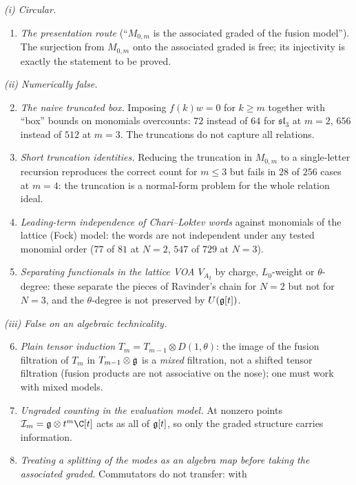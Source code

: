 \begin{warning}[title={Approaches to the total bound (Input T) that fail}]
\emph{(i) Circular.}
\begin{enumerate}
\item \emph{The presentation route} (``$M_{0,m}$ is the associated graded of the fusion model''). The surjection from $M_{0,m}$ onto the
  associated graded is free; its injectivity is exactly the statement to be proved.
\end{enumerate}
\emph{(ii) Numerically false.}
\begin{enumerate}\setcounter{enumi}{1}
\item \emph{The naive truncated box.} Imposing $f(k)w=0$ for $k\ge m$ together with ``box'' bounds on monomials overcounts: $72$ instead of
  $64$ for $\mathfrak{sl}_3$ at $m=2$, $656$ instead of $512$ at $m=3$. The truncations do not capture all relations.
\item \emph{Short truncation identities.} Reducing the truncation in $M_{0,m}$ to a single-letter recursion reproduces the correct count
  for $m\le3$ but fails in $28$ of $256$ cases at $m=4$: the truncation is a normal-form problem for the whole relation ideal.
\item \emph{Leading-term independence of Chari--Loktev words} against monomials of the lattice (Fock) model: the words are not independent
  under any tested monomial order ($77$ of $81$ at $N=2$, $547$ of $729$ at $N=3$).
\item \emph{Separating functionals in the lattice VOA $V_{A_2}$} by charge, $L_0$-weight or $\theta$-degree: these separate the pieces of
  Ravinder's chain for $N=2$ but not for $N=3$, and the $\theta$-degree is not preserved by $U(\mathfrak g[t])$.
\end{enumerate}
\emph{(iii) False on an algebraic technicality.}
\begin{enumerate}\setcounter{enumi}{5}
\item \emph{Plain tensor induction} $T_m=T_{m-1}\otimes D(1,\theta)$: the image of the fusion filtration of $T_m$ in $T_{m-1}\otimes\mathfrak g$ is
  a \emph{mixed} filtration, not a shifted tensor filtration (fusion products are not associative on the nose); one must work with mixed
  models.
\item \emph{Ungraded counting in the evaluation model.} At nonzero points $\mathcal I_m=\ltwentyseveng\otimes t^m\C[t]$ acts as all of
  $\mathfrak g[t]$, so only the graded structure carries information.
\item \emph{Treating a splitting of the modes as an algebra map before taking the associated graded.} Commutators do not transfer: with

\end{enumerate}
\end{warning}
